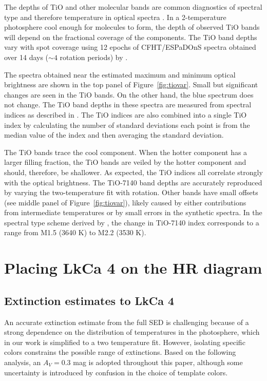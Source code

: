 \documentclass[twocolumn]{emulateapj}%
\begin{document}
The depths of TiO and other molecular bands are common diagnostics of spectral type and therefore temperature in optical spectra \citep[e.g.][]{kirkpatrick91}.  In a 2-temperature photosphere cool enough for molecules to form, the depth of observed TiO bands will depend on the fractional coverage of the components.  The TiO band depths vary with spot coverage using 12 epochs of CFHT/ESPaDOnS spectra obtained over 14 days ($\sim 4$ rotation periods) by \citet{donati14}.

The spectra obtained near the estimated maximum and minimum optical brightness are shown in the top panel of Figure~\ref{fig:tiovar}.  Small but significant changes are seen in the TiO bands.  On the other hand, the blue spectrum does not change.  The TiO band depths in these spectra are measured from spectral indices as described in \citet{herczeg14}.  The TiO indices are also combined into a single TiO index by calculating the number of standard deviations each point is from the median value of the index and then averaging the standard deviation.  

The TiO bands trace the cool component.  When the hotter component has a larger filling fraction, the TiO bands are veiled by the hotter component and should, therefore, be shallower. As expected, 
the TiO indices all correlate strongly with the optical brightness.  The TiO-7140 band depths are accurately reproduced by varying the two-temperature fit with rotation.  Other bands have small offsets (see middle panel of Figure~\ref{fig:tiovar}), likely caused by either contributions from intermediate temperatures or by small errors in the synthetic spectra.  In the spectral type scheme derived by \citet{herczeg14}, the change in TiO-7140 index corresponds to a range from M1.5 (3640 K) to M2.2 (3530 K). 


\section{Placing LkCa 4 on the HR diagram}


\subsection{Extinction estimates to LkCa 4}

An accurate extinction estimate from the full SED is challenging because of a strong dependence on the distribution of temperatures in the photosphere, which in our work is simplified to a two temperature fit.  However, isolating specific colors constrains the possible range of extinctions.  Based on the following analysis, an $A_V=0.3$ mag is adopted throughout this paper, although some uncertainty is introduced by confusion in the choice of template colors.
\end{document}
